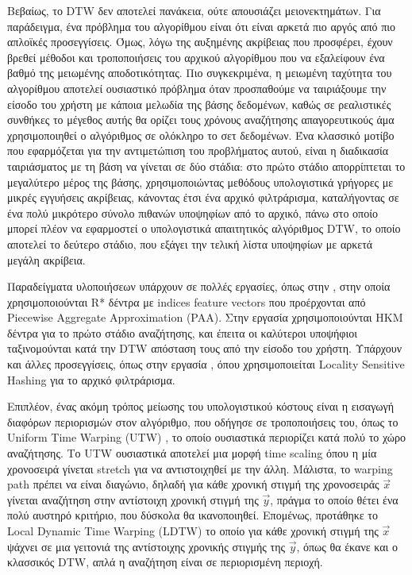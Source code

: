 Βεβαίως, το DTW δεν αποτελεί πανάκεια, ούτε απουσιάζει μειονεκτημάτων.
Για παράδειγμα, ένα πρόβλημα του αλγορίθμου είναι ότι είναι αρκετά πιο αργός
από πιο απλοϊκές προσεγγίσεις.
Όμως, λόγω της αυξημένης ακρίβειας που προσφέρει, έχουν βρεθεί μέθοδοι και
τροποποιήσεις του αρχικού αλγορίθμου που να εξαλείφουν ένα βαθμό της μειωμένης
αποδοτικότητας.
Πιο συγκεκριμένα, η μειωμένη ταχύτητα του αλγορίθμου αποτελεί ουσιαστικό
πρόβλημα όταν προσπαθούμε να ταιριάξουμε την είσοδο του χρήστη με κάποια
μελωδία της βάσης δεδομένων, καθώς σε ρεαλιστικές συνθήκες το μέγεθος αυτής
θα ορίζει τους χρόνους αναζήτησης απαγορευτικούς άμα χρησιμοποιηθεί ο αλγόριθμος
σε ολόκληρο το σετ δεδομένων.
Ένα κλασσικό μοτίβο που εφαρμόζεται για την αντιμετώπιση του προβλήματος αυτού,
είναι η διαδικασία ταιριάσματος με τη βάση να γίνεται σε δύο στάδια: στο πρώτο
στάδιο απορρίπτεται το μεγαλύτερο μέρος της βάσης, χρησιμοποιώντας μεθόδους
υπολογιστικά γρήγορες με μικρές εγγυήσεις ακρίβειας, κάνοντας έτσι ένα αρχικό
φιλτράρισμα, καταλήγοντας σε ένα πολύ μικρότερο σύνολο πιθανών υποψηφίων από
το αρχικό, πάνω στο οποίο μπορεί πλέον να εφαρμοστεί ο υπολογιστικά απαιτητικός
αλγόριθμος DTW, το οποίο αποτελεί το δεύτερο στάδιο, που εξάγει την τελική
λίστα υποψηφίων με αρκετά μεγάλη ακρίβεια.

Παραδείγματα υλοποιήσεων υπάρχουν σε πολλές εργασίες, όπως στην
\cite{Zhu:2003:WIE:872757.872780}, στην οποία χρησιμοποιούνται R* δέντρα με
indices feature vectors που προέρχονται από Piecewise Aggregate Approximation
(PAA). Στην εργασία \cite{hou2014mirex2014} χρησιμοποιούνται HKM δέντρα για το
πρώτο στάδιο αναζήτησης, και έπειτα οι καλύτεροι υποψήφιοι ταξινομούνται κατά
την DTW απόσταση τους από την είσοδο του χρήστη. Υπάρχουν και άλλες
προσεγγίσεις, όπως στην εργασία \cite{ryynanen2008query}, όπου χρησιμοποιείται
Locality Sensitive Hashing για το αρχικό φιλτράρισμα.

Επιπλέον, ένας ακόμη τρόπος μείωσης του υπολογιστικού κόστους είναι η εισαγωγή
διαφόρων περιορισμών στον αλγόριθμο, που οδήγησε σε τροποποιήσεις του, όπως το
Uniform Time Warping (UTW) \cite{Zhu:2003:WIE:872757.872780}, το οποίο
ουσιαστικά περιορίζει κατά πολύ το χώρο αναζήτησης.
Το UTW ουσιαστικά αποτελεί μια μορφή time scaling όπου η μία χρονοσειρά γίνεται
stretch για να αντιστοιχηθεί με την άλλη.
Μάλιστα, το warping path πρέπει να είναι διαγώνιο, δηλαδή για κάθε χρονική
στιγμή της χρονοσειράς $\vec x$ γίνεται αναζήτηση στην αντίστοιχη χρονική στιγμή
της $\vec y$, πράγμα το οποίο θέτει ένα πολύ αυστηρό κριτήριο, που δύσκολα θα
ικανοποιηθεί.
Επομένως, προτάθηκε το Local Dynamic Time Warping (LDTW)
\cite{Zhu:2003:WIE:872757.872780} το οποίο για κάθε χρονική στιγμή της $\vec x$
ψάχνει σε μια γειτονιά της αντίστοιχης χρονικής στιγμής της $\vec y$, όπως θα
έκανε και ο κλασσικός DTW, απλά η αναζήτηση είναι σε περιορισμένη περιοχή.

